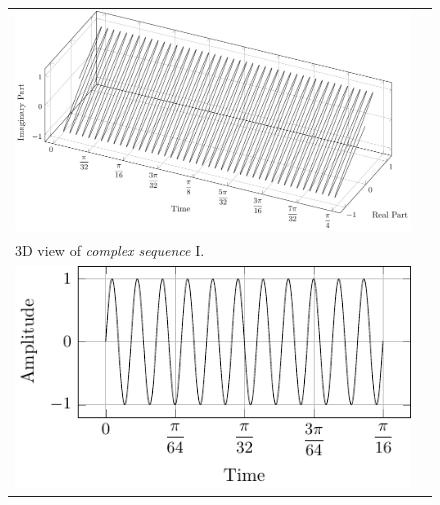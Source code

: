 \documentclass[../../course]{subfiles}
\begin{document}
\begin{figure} [H]

    \renewcommand{\arraystretch}{0.75}
    \centering
    \begin{NiceTabularX} {\textwidth} {
            *{2}{>{\centering\arraybackslash}X}
        }

         {
             {
                \includegraphics[height = \textheight] {tikzpics/plotComplexI.pdf}
            }
        }

        &
        \\

         {
            \vbox{
                 {3D view of \emph{complex sequence} I.}
                \label{plt:cmplxI}
            }
        }

        &
        \\

         {
             {
                \includegraphics[height = \textheight] {tikzpics/plotShortX3.pdf}
            }
        }

        &


\end{NiceTabularX}
\end{figure}
\end{document}
